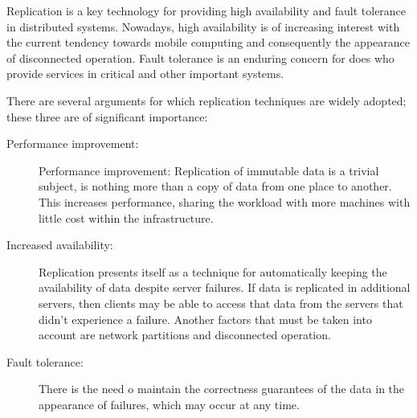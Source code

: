 Replication is a key technology for providing high availability and fault tolerance in distributed systems. Nowadays, high availability is of increasing interest with the current tendency towards mobile computing and consequently the appearance of disconnected operation. Fault tolerance is an enduring concern for does who provide services in critical and other important systems.

There are several arguments for which replication techniques are widely adopted; these three are of significant importance:

\begin{description}
	\item [Performance improvement:] Performance improvement: Replication of immutable data is a trivial subject, is nothing more than a copy of data from one place to another. This increases performance, sharing the workload with more machines with little cost within the infrastructure.
	\item [Increased availability:] Replication presents itself as a technique for automatically keeping the availability of data despite server failures. If data is replicated in additional servers, then clients may be able to access that data from the servers that didn't experience a failure.
Another factors that must be taken into account are network partitions and disconnected operation.
	\item [Fault tolerance:] There is the need o maintain the correctness guarantees of the data in the appearance of failures, which may occur at any time.
\end{description}







 

